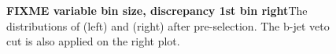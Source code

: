 \begin{figure}[!Hhtb]
\caption{{\bf FIXME variable bin size, discrepancy 1st bin right}The distributions of \mttwo (left) and \SumMT (right) after pre-selection. The b-jet veto cut is also applied on the right plot.}
\label{fig:comparison}
\end{figure}
